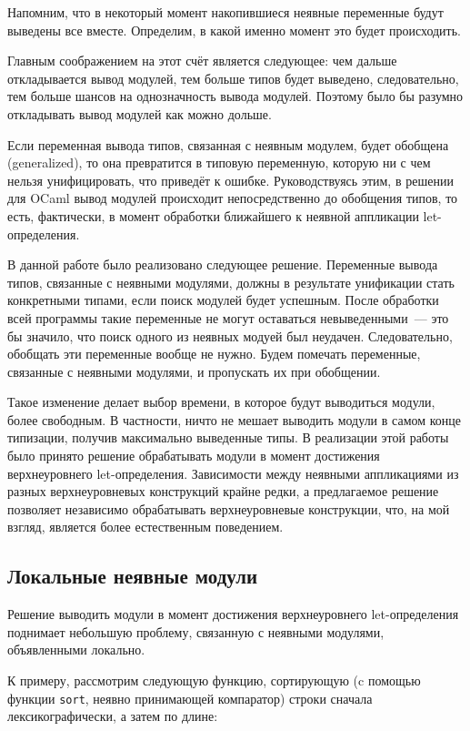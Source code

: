 \documentclass[../diploma.tex]{subfiles}
\begin{document}
Напомним, что в некоторый момент накопившиеся неявные переменные будут выведены все вместе. Определим, в какой именно момент это будет происходить.

Главным соображением на этот счёт является следующее: чем дальше откладывается вывод модулей, тем больше типов будет выведено, следовательно, тем больше шансов на однозначность вывода модулей. Поэтому было бы разумно откладывать вывод модулей как можно дольше.

Если переменная вывода типов, связанная с неявным модулем, будет обобщена (generalized), то она превратится в типовую переменную, которую ни с чем нельзя унифицировать, что приведёт к ошибке. Руководствуясь этим, в решении для OCaml вывод модулей происходит непосредственно до обобщения типов, то есть, фактически, в момент обработки ближайшего к неявной аппликации let-определения.

В данной работе было реализовано следующее решение. Переменные вывода типов, связанные с неявными модулями, должны в результате унификации стать конкретными типами, если поиск модулей будет успешным. После обработки всей программы такие переменные не могут оставаться невыведенными~--- это бы значило, что поиск одного из неявных модуей был неудачен. Следовательно, обобщать эти переменные вообще не нужно. Будем помечать переменные, связанные с неявными модулями, и пропускать их при обобщении. 

Такое изменение делает выбор времени, в которое будут выводиться модули, более свободным. В частности, ничто не мешает выводить модули в самом конце типизации, получив максимально выведенные типы. В реализации этой работы было принято решение обрабатывать модули в момент достижения верхнеуровнего let-определения. Зависимости между неявными аппликациями из разных верхнеуровневых конструкций крайне редки, а предлагаемое решение позволяет независимо обрабатывать верхнеуровневые конструкции, что, на мой взгляд, является более естественным поведением.

\subsection{Локальные неявные модули}

Решение выводить модули в момент достижения верхнеуровнего let-определения поднимает небольшую проблему, связанную с неявными модулями, объявленными локально.

К примеру, рассмотрим следующую функцию, сортирующую (c помощью функции \texttt{sort}, неявно принимающей компаратор) строки сначала лексикографически, а затем по длине:
\end{document}
